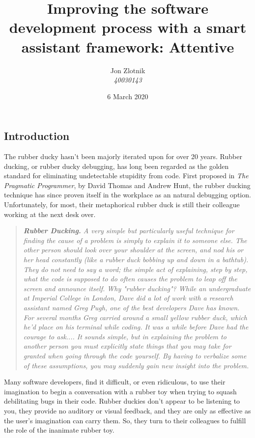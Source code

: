 \documentclass{article}
\title{Improving the software development process with a smart assistant framework: Attentive}
\author{Jon Zlotnik \\ \textit{40030143}}
\date{6 March 2020}
\begin{document}
\maketitle

\begin{multicols}{2}

\section{Introduction}
The rubber ducky hasn't been majorly iterated upon for over 20 years. 
Rubber ducking, or rubber ducky debugging, has long been regarded as the golden standard for eliminating undetectable stupidity from code. 
First proposed in \textit{The Pragmatic Programmer}, by David Thomas and Andrew Hunt, the rubber ducking technique has since proven itself in the workplace as an natural debugging option. \cite{book:Hunt1999} 
Unfortunately, for most, their metaphorical rubber duck is still their colleague working at the next desk over.

\begin{quote}
    \textit{\textbf{Rubber Ducking.}
A very simple but particularly useful technique for finding the cause of a problem is simply to explain it to someone else. 
The other person should look over your shoulder at the screen, and nod his or her head constantly 
(like a rubber duck bobbing up and down in a bathtub). 
They do not need to say a word; the simple act of explaining, step by step, what the code is supposed to do often causes the problem to leap off the screen and announce itself.
Why "rubber ducking"? While an undergraduate at Imperial College in London, Dave did a lot of work with a research assistant named Greg Pugh, one of the best developers Dave has known. 
For several months Greg carried around a small yellow rubber duck, which he'd place on his terminal while
coding. It was a while before Dave had the courage to ask....
It sounds simple, but in explaining the problem to another person you must explicitly state things that you may take for granted when going through the code yourself. By having to verbalize some of these assumptions, you may suddenly gain new insight into the problem.}
\cite{book:Hunt1999}
\end{quote}

Many software developers, find it difficult, or even ridiculous, to use their imagination to begin a conversation with a rubber toy when trying to squash debilitating bugs in their code.
Rubber duckies don't appear to be listening to you, they provide no auditory or visual feedback, and they are only as effective as the user's imagination can carry them. 
So, they turn to their colleagues to fulfill the role of the inanimate rubber toy.


\end{multicols}
\end{document}
